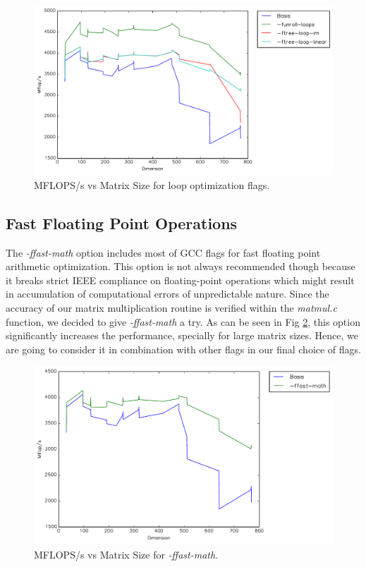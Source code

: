 \documentclass{article}
\begin{document}
  \begin{figure}[h]
    \centering
    \includegraphics[width=.7\textwidth]{timing-loops.pdf}
    \caption{MFLOPS/s vs Matrix Size for loop optimization flags.}
    \label{fig:timing-loops}
  \end{figure}

\subsection{Fast Floating Point Operations}

The \textit{-ffast-math} option includes most of GCC flags for fast floating point arithmetic optimization.  This option is not always recommended though because it breaks strict IEEE compliance on floating-point operations which might result in accumulation of computational errors of unpredictable nature. Since the accuracy of our matrix multiplication routine is verified within the \textit{ matmul.c} function, we decided to give \textit{-ffast-math} a try. As can be seen in Fig \ref{fig:timing-math}, this option significantly increases the performance, specially for large matrix sizes. Hence, we are going to consider it in combination with other flags in our final choice of flags.

  \begin{figure}[h]
    \centering
    \includegraphics[width=.7\textwidth]{timing-math.pdf}
    \caption{MFLOPS/s vs Matrix Size for \textit{-ffast-math}.}
    \label{fig:timing-math}
  \end{figure}
\end{document}
